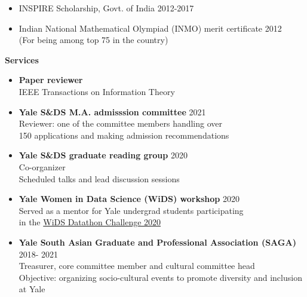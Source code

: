 \documentclass[letterpaper,11pt,oneside]{article}
\theoremstyle{definition}
\begin{document}
	\begin{itemize}
		\item [] INSPIRE Scholarship, Govt. of India \hfill 2012-2017
		\item [] Indian National Mathematical Olympiad (INMO) merit certificate \hfill 2012\\
		(For being among top 75 in the country)
	\end{itemize}

	
	\noindent \textbf{Services}
	\begin{itemize}
		\item[]
		{\bf Paper reviewer}\\
		IEEE Transactions on Information Theory
		
		
		\item[] {\bf Yale S\&DS M.A. admisssion committee} \hfill 2021\\
		Reviewer: one of the committee members
		handling over\\ 150 applications
		and making admission recommendations
		
		\item[] {\bf Yale S\&DS graduate reading group} \hfill 2020\\
		Co-organizer\\
		Scheduled talks and lead discussion sessions
		
		\item[] {\bf Yale Women in Data Science (WiDS) workshop} \hfill 2020\\
		Served as a mentor for Yale undergrad students participating \\
		in the \href{https://www.widsconference.org/blog_archive/wids-datathon-2020-workshops-worldwide}{WiDS Datathon Challenge 2020}
		
		\item[] {\bf Yale South Asian Graduate and Professional Association (SAGA)} \hfill 2018- 2021\\
		Treasurer, core committee member and cultural committee head\\
		Objective: organizing socio-cultural events to promote diversity and inclusion at Yale
		
		
	\end{itemize}

	\clearpage
	
\end{document}
